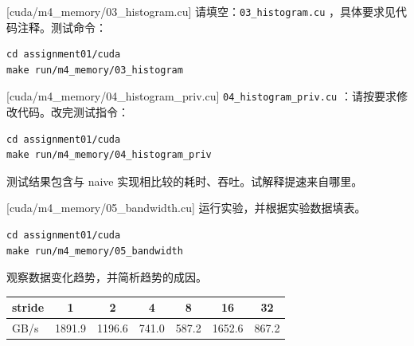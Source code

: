 \documentclass[11pt,a4paper,fontset=none]{ctexart}
\begin{document}
[cuda/m4\_memory/03\_histogram.cu]
请填空：\texttt{03\_histogram.cu} ，具体要求见代码注释。测试命令：

\begin{lstlisting}
cd assignment01/cuda
make run/m4_memory/03_histogram
\end{lstlisting}

[cuda/m4\_memory/04\_histogram\_priv.cu]
\texttt{04\_histogram\_priv.cu} ：请按要求修改代码。改完测试指令：

\begin{lstlisting}
cd assignment01/cuda
make run/m4_memory/04_histogram_priv
\end{lstlisting}

测试结果包含与 naive 实现相比较的耗时、吞吐。试解释提速来自哪里。


[cuda/m4\_memory/05\_bandwidth.cu]
运行实验，并根据实验数据填表。

\begin{lstlisting}
cd assignment01/cuda
make run/m4_memory/05_bandwidth
\end{lstlisting}

观察数据变化趋势，并简析趋势的成因。

\begin{center}\small
\begin{tabular}{@{}lcccccc@{}}
\toprule
stride & 1 & 2 & 4 & 8 & 16 & 32 \\
\midrule
GB/s & 1891.9 & 1196.6 & 741.0 & 587.2 & 1652.6 & 867.2 \\
\bottomrule
\end{tabular}
\end{center}

\end{document}
